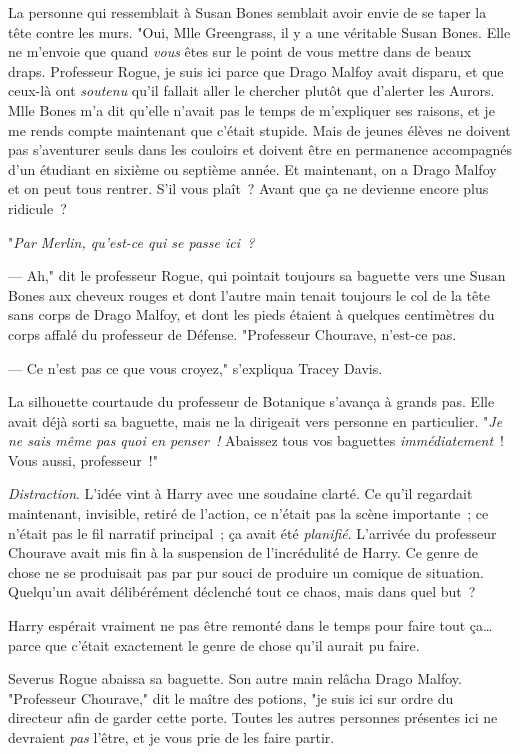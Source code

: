 La personne qui ressemblait à Susan Bones semblait avoir envie de se taper la tête contre les murs. "Oui, Mlle Greengrass, il y a une véritable Susan Bones. Elle ne m'envoie que quand \emph{vous} êtes sur le point de vous mettre dans de beaux draps. Professeur Rogue, je suis ici parce que Drago Malfoy avait disparu, et que ceux-là ont \emph{soutenu} qu'il fallait aller le chercher plutôt que d'alerter les Aurors. Mlle Bones m'a dit qu'elle n'avait pas le temps de m'expliquer ses raisons, et je me rends compte maintenant que c'était stupide. Mais de jeunes élèves ne doivent pas s'aventurer seuls dans les couloirs et doivent être en permanence accompagnés d'un étudiant en sixième ou septième année. Et maintenant, on a Drago Malfoy et on peut tous rentrer. S'il vous plaît~? Avant que ça ne devienne encore plus ridicule~?

"\emph{Par Merlin, qu'est-ce qui se passe ici~?}

--- Ah," dit le professeur Rogue, qui pointait toujours sa baguette vers une Susan Bones aux cheveux rouges et dont l'autre main tenait toujours le col de la tête sans corps de Drago Malfoy, et dont les pieds étaient à quelques centimètres du corps affalé du professeur de Défense. "Professeur Chourave, n'est-ce pas.

--- Ce n'est pas ce que vous croyez," s'expliqua Tracey Davis.

La silhouette courtaude du professeur de Botanique s'avança à grands pas. Elle avait déjà sorti sa baguette, mais ne la dirigeait vers personne en particulier. "\emph{Je ne sais même pas quoi en penser~!} Abaissez tous vos baguettes \emph{immédiatement}~! Vous aussi, professeur~!"

\emph{Distraction}. L'idée vint à Harry avec une soudaine clarté. Ce qu'il regardait maintenant, invisible, retiré de l'action, ce n'était pas la scène importante~; ce n'était pas le fil narratif principal~; ça avait été \emph{planifié}. L'arrivée du professeur Chourave avait mis fin à la suspension de l'incrédulité de Harry. Ce genre de chose ne se produisait pas par pur souci de produire un comique de situation. Quelqu'un avait délibérément déclenché tout ce chaos, mais dans quel but~?

Harry espérait vraiment ne pas être remonté dans le temps pour faire tout ça… parce que c'était exactement le genre de chose qu'il aurait pu faire.

Severus Rogue abaissa sa baguette. Son autre main relâcha Drago Malfoy. "Professeur Chourave," dit le maître des potions, "je suis ici sur ordre du directeur afin de garder cette porte. Toutes les autres personnes présentes ici ne devraient \emph{pas} l'être, et je vous prie de les faire partir.

